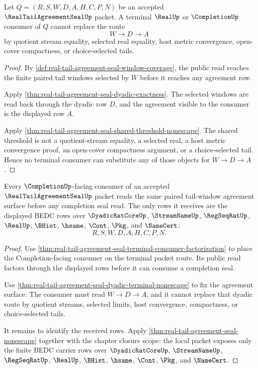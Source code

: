 \begin{theorem}
\label{thm:real-tail-agreement-seal-dyadic-terminal-nonescape}
Let $Q=(R,S,W,D,A,H,C,P,N)$ be an accepted $\RealTailAgreementSealUp$ packet. A terminal $\RealUp$ or $\CompletionUp$ consumer of $Q$ cannot replace the route
$$
W \to D \to A
$$
by quotient stream equality, selected real equality, host metric convergence, open-cover compactness, or choice-selected tails.
\end{theorem}
\begin{proof}
By \autoref{def:real-tail-agreement-seal-window-coverage}, the public read reaches the finite paired tail windows selected by $W$ before it reaches any agreement row.

Apply \autoref{thm:real-tail-agreement-seal-dyadic-exactness}. The selected windows are read back through the dyadic row $D$, and the agreement visible to the consumer is the displayed row $A$.

Apply \autoref{thm:real-tail-agreement-seal-shared-threshold-nonescape}. The shared threshold is not a quotient-stream equality, a selected real, a host metric convergence proof, an open-cover compactness argument, or a choice-selected tail. Hence no terminal consumer can substitute any of those objects for $W \to D \to A$.
\end{proof}

\begin{theorem}
\label{thm:real-tail-agreement-seal-completion-consumer-exactness}
Every $\CompletionUp$-facing consumer of an accepted $\RealTailAgreementSealUp$ packet reads the same paired tail-window agreement surface before any completion seal read. The only rows it receives are the displayed BEDC rows over $\DyadicRatCoreUp$, $\StreamNameUp$, $\RegSeqRatUp$, $\RealUp$, $\BHist$, $\hsame$, $\Cont$, $\Pkg$, and $\NameCert$:
$$
R,S,W,D,A,H,C,P,N.
$$
\end{theorem}
\begin{proof}
Use \autoref{thm:real-tail-agreement-seal-terminal-consumer-factorization} to place the Completion-facing consumer on the terminal packet route. Its public read factors through the displayed rows before it can consume a completion seal.

Use \autoref{thm:real-tail-agreement-seal-dyadic-terminal-nonescape} to fix the agreement surface. The consumer must read $W \to D \to A$, and it cannot replace that dyadic route by quotient streams, selected limits, host convergence, compactness, or choice-selected tails.

It remains to identify the received rows. Apply \autoref{thm:real-tail-agreement-seal-nonescape} together with the chapter closure scope: the local packet exposes only the finite BEDC carrier rows over $\DyadicRatCoreUp$, $\StreamNameUp$, $\RegSeqRatUp$, $\RealUp$, $\BHist$, $\hsame$, $\Cont$, $\Pkg$, and $\NameCert$.
\end{proof}

